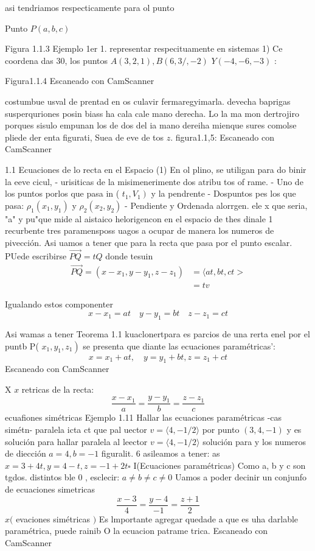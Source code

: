

asi tendriamos respecticamente para ol punto

Punto $P(a, b, c)$

Figura 1.1.3
Ejemplo 1er 1. representar respecituamente en sistemas
1) Ce coordena das 30, los puntos $A(3,2,1), B(6,3 /,-2)$ $Y(-4,-6,-3)$ :

Figura1.1.4
Escaneado con CamScanner




costumbue usval de prentad en os culavir fermaregyimarla. devecha baprigas susperquriones posin biass ha cala cale mano derecha. Lo la ma mon dertrojiro porques sisulo empunan los de dos del ia mano dereiha mienque sures comolse pliede der enta figurati, Suea de eve de tos $z$.
figura1.1,5:
Escaneado con CamScanner




1.1 Ecuaciones de lo recta en el Espacio
(1) En ol plino, se utiligan para do binir la eeve cicul, - urisiticas de la misimenerimente dos atribu tos of rame.
- Uno de los puntos porlos que pasa in ( $\left.t_1, V_1\right)$ y la pendrente
- Dospuntos pes los que pasa: $\rho_1\left(x_1, y_1\right)$ y $\rho_2\left(x_2, y_2\right)$
- Pendiente y Ordenada alorrgen. ele x que seria, "a" y pu"que mide al aistaico helorigencon en el espacio de thes dinale 1
recurbente tres paramensposs uagos a ocupar de manera los numeros de pivección. Asi uamos a tener que para la recta que pasa por el punto escalar. PUede escribirse $\overrightarrow{P Q}=t Q$ donde tesuin
$$
\begin{aligned}
	\overrightarrow{P Q}=\left(x-x_1, y-y_1, z-z_1\right) & =\langle a t, b t, c t> \\
	& =t v
\end{aligned}
$$

Igualando estos componenter
$$
x-x_1=a t \quad y-y_1=b t \quad z-z_1=c t
$$

Asi wamas a tener
Teorema 1.1 kuaclonertpara es parcios de una rerta enel por el puntb P( $\left.x_1, y_1, z_1\right)$ se presenta que diante las ecuaciones paramétricas':
$$
x=x_1+a t, \quad y=y_1+b t, z=z_1+c t
$$
Escaneado con CamScanner




X $x$ retricas de la recta:
$$
\frac{x-x_1}{a}=\frac{y-y_1}{b}=\frac{z-z_1}{c}
$$
ecuafiones
simétricas Ejemplo 1.11 Hallar las ecuaciones paramétricas
-cas simétn-
paralela icta ct que pal uector $v=\langle 4,-1 / 2\rangle$ por punto $(3,4,-1)$ y es
solución para hallar paralela al leector $v=\langle 4,-1 / 2\rangle$
solución para y los numeros de diección $a=4, b=-1$
figuralit. 6 asileamos a tener:
as
$x=3+4 t, y=4-t, z=-1+2 t \square$
I(Ecuaciones paramétricas) Como a, b y c son tgdos.
distintos ble 0 , esclecir: $a \neq b \neq c \neq 0$ Uamos a poder decinir un
conjunfo de ecuaciones simetricas
$$
\frac{x-3}{4}=\frac{y-4}{-1}=\frac{z+1}{2}
$$
$x($ evaciones simétricas $)$ Es lmportante agregar quedade a que es uha darlable paramétrica, puede rainib O la ecuacion patrame trica.
Escaneado con CamScanner


